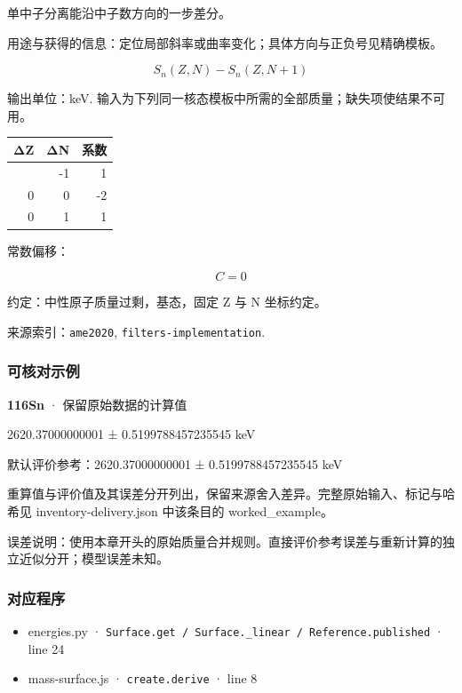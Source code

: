 \documentclass[
  11pt,
  letterpaper,
]{article}
\providecommand{\tightlist}{%
  \setlength{\itemsep}{0pt}\setlength{\parskip}{0pt}}
\begin{document}
单中子分离能沿中子数方向的一步差分。

用途与获得的信息：定位局部斜率或曲率变化；具体方向与正负号见精确模板。

\[
S_n(Z,N)-S_n(Z,N+1)
\]

输出单位：keV.
输入为下列同一核态模板中所需的全部质量；缺失项使结果不可用。

\begin{longtable}[]{@{}rrr@{}}
\toprule\noalign{}
ΔZ & ΔN & 系数 \\
\midrule\noalign{}
\endhead
\bottomrule\noalign{}
\endlastfoot
0 & -1 & 1 \\
0 & 0 & -2 \\
0 & 1 & 1 \\
\end{longtable}

常数偏移：

\[
C=0
\]

约定：中性原子质量过剩，基态，固定 Z 与 N 坐标约定。

来源索引：\texttt{ame2020}, \texttt{filters-implementation}.

\subsubsection{可核对示例}\label{ux53efux6838ux5bf9ux793aux4f8b-28}

\textbf{116Sn} · 保留原始数据的计算值

2620.37000000001 ± 0.5199788457235545 keV

默认评价参考：2620.37000000001 ± 0.5199788457235545 keV

重算值与评价值及其误差分开列出，保留来源舍入差异。完整原始输入、标记与哈希见
inventory-delivery.json 中该条目的 worked\_example。

误差说明：使用本章开头的原始质量合并规则。直接评价参考误差与重新计算的独立近似分开；模型误差未知。

\subsubsection{对应程序}\label{ux5bf9ux5e94ux7a0bux5e8f-28}

\begin{itemize}
\tightlist
\item
  energies.py ·
  \texttt{Surface.get\ /\ Surface.\_linear\ /\ Reference.published} ·
  line 24
\item
  mass-surface.js · \texttt{create.derive} · line 8
\end{itemize}
\end{document}
